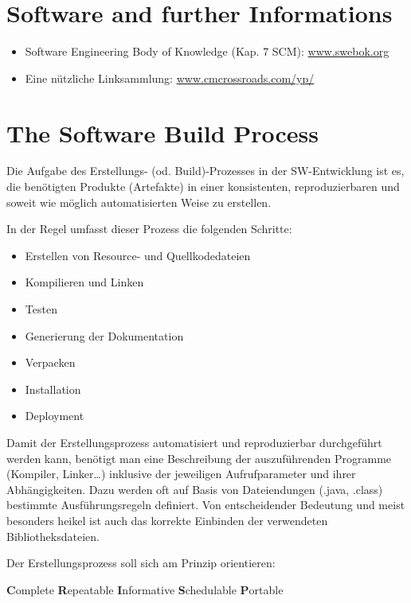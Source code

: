 \section{Software and further Informations}
\begin{itemize}
\item Software Engineering Body of Knowledge (Kap. 7 SCM):
  \href{http://www.swebok.org}{www.swebok.org}
\item Eine nützliche  Linksammlung: \href{http://www.cmcrossroads.com/yp}
                                          {www.cmcrossroads.com/yp/}
\end{itemize}
\newslide
%
\section{The Software Build Process}
Die Aufgabe des Erstellungs- (od. Build)-Prozesses in der
SW-Entwicklung ist es, die
benötigten Produkte (Artefakte) in einer konsistenten,
reproduzierbaren und soweit wie möglich
automatisierten Weise zu erstellen.

In der Regel umfasst
dieser Prozess die folgenden Schritte:
\begin{itemize}
\item Erstellen von Resource- und Quellkodedateien %
\item Kompilieren und Linken
\item Testen
\item Generierung der Dokumentation
\item Verpacken
\item Installation
\item Deployment
\end{itemize}
Damit der Erstellungsprozess automatisiert und reproduzierbar
durchgeführt werden kann,
benötigt man eine Beschreibung der auszuführenden Programme
(Kompiler, Linker\ldots) inklusive der jeweiligen Aufrufparameter und
ihrer Abhängigkeiten. Dazu werden oft auf Basis von Dateiendungen (.java,
.class) bestimmte Ausführungsregeln definiert.
Von entscheidender Bedeutung und meist besonders heikel
ist auch das korrekte Einbinden der
verwendeten Bibliotheksdateien.

Der Erstellungsprozess soll sich am Prinzip  orientieren:

 {\bfseries C}omplete {\bfseries R}epeatable {\bfseries I}nformative {\bfseries S}chedulable {\bfseries P}ortable

